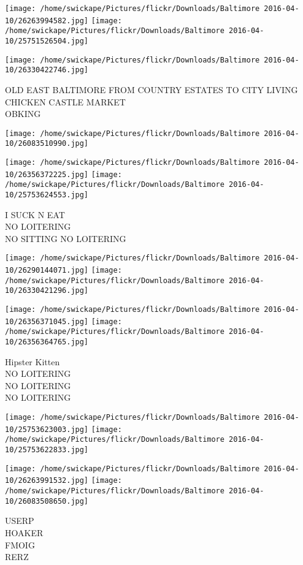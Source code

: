 \documentclass[10pt,letterpaper]{article}
\begin{document}
\texttt{[image: /home/swickape/Pictures/flickr/Downloads/Baltimore 2016-04-10/26263994582.jpg]}
\texttt{[image: /home/swickape/Pictures/flickr/Downloads/Baltimore 2016-04-10/25751526504.jpg]}

\texttt{[image: /home/swickape/Pictures/flickr/Downloads/Baltimore 2016-04-10/26330422746.jpg]}

OLD EAST BALTIMORE FROM COUNTRY ESTATES TO CITY LIVING\\
CHICKEN CASTLE MARKET\\
OBKING
\pagebreak

\texttt{[image: /home/swickape/Pictures/flickr/Downloads/Baltimore 2016-04-10/26083510990.jpg]}

\vspace{0.25in}
\texttt{[image: /home/swickape/Pictures/flickr/Downloads/Baltimore 2016-04-10/26356372225.jpg]}
\texttt{[image: /home/swickape/Pictures/flickr/Downloads/Baltimore 2016-04-10/25753624553.jpg]}

I SUCK N EAT\\
NO LOITERING\\
NO SITTING NO LOITERING
\pagebreak

\texttt{[image: /home/swickape/Pictures/flickr/Downloads/Baltimore 2016-04-10/26290144071.jpg]}
\texttt{[image: /home/swickape/Pictures/flickr/Downloads/Baltimore 2016-04-10/26330421296.jpg]}

\texttt{[image: /home/swickape/Pictures/flickr/Downloads/Baltimore 2016-04-10/26356371045.jpg]}
\texttt{[image: /home/swickape/Pictures/flickr/Downloads/Baltimore 2016-04-10/26356364765.jpg]}

Hipster Kitten\\
NO LOITERING\\
NO LOITERING\\
NO LOITERING
\pagebreak

\texttt{[image: /home/swickape/Pictures/flickr/Downloads/Baltimore 2016-04-10/25753623003.jpg]}
\texttt{[image: /home/swickape/Pictures/flickr/Downloads/Baltimore 2016-04-10/25753622833.jpg]}

\texttt{[image: /home/swickape/Pictures/flickr/Downloads/Baltimore 2016-04-10/26263991532.jpg]}
\texttt{[image: /home/swickape/Pictures/flickr/Downloads/Baltimore 2016-04-10/26083508650.jpg]}

USERP\\
HOAKER\\
FMOIG\\
RERZ
\pagebreak
\end{document}
